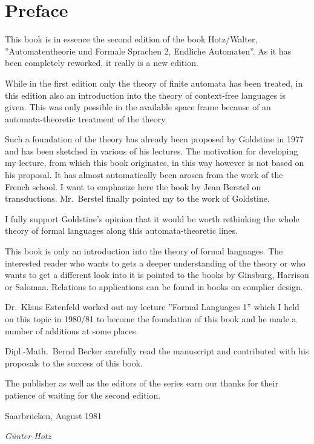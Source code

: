 \chapter*{Preface}

This book is in essence the second edition of the book Hotz/Walter,
''Automatentheorie und Formale Sprachen 2, Endliche Automaten''. As it has been
completely reworked, it really is a new edition.

While in the first edition only the theory of finite automata has been treated,
in this edition also an introduction into the theory of context-free languages
is given. This was only possible in the available space frame because
of an automata-theoretic treatment of the theory.

Such a foundation of the theory has already been proposed by Goldstine in 1977
and has been sketched in various of his lectures. The motivation for developing
my lecture, from which this book originates, in this way however is not based on
 his proposal. It has almost automatically been arosen from the
work of the French school. I want to emphasize here the book by Jean Berstel on
transductions. Mr.\ Berstel finally pointed my to the work of Goldstine.

I fully support Goldstine's opinion that it would be worth rethinking the
whole theory of formal languages along this automata-theoretic lines.

This book is only an introduction into the theory of formal languages. The
interested reader who wants to gets a deeper understanding of the theory or who
wants to get a different look into it is pointed to the books by Ginsburg,
Harrison or Salomaa. Relations to applications can be found in books on complier
design.

Dr.\ Klaus Estenfeld worked out my lecture ''Formal Languages 1'' which I held 
on this topic in 1980/81 to become the foundation of this book and he made a
number of additions at some places.

Dipl.-Math.\ Bernd Becker carefully read the manuscript and contributed with his
proposals to the success of this book.

The publisher as well as the editors of the series earn our thanks for their
patience of waiting for the second edition.

Saarbrücken, August 1981

\vspace{2em}
{\em Günter Hotz}
